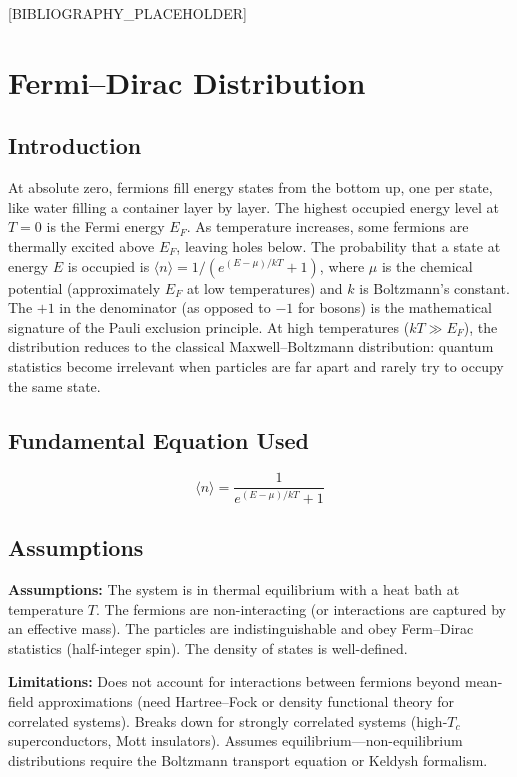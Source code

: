 \documentclass[11pt,openright]{book}
\begin{document}
[BIBLIOGRAPHY_PLACEHOLDER]


\chapter{Fermi--Dirac Distribution}

\section*{Introduction}

At absolute zero, fermions fill energy states from the bottom up, one per state, like water filling a container layer by layer. The highest occupied energy level at $T = 0$ is the Fermi energy $E_F$. As temperature increases, some fermions are thermally excited above $E_F$, leaving holes below. The probability that a state at energy $E$ is occupied is $\langle n \rangle = 1/(e^{(E-\mu)/kT} + 1)$, where $\mu$ is the chemical potential (approximately $E_F$ at low temperatures) and $k$ is Boltzmann's constant. The $+1$ in the denominator (as opposed to $-1$ for bosons) is the mathematical signature of the Pauli exclusion principle. At high temperatures ($kT \gg E_F$), the distribution reduces to the classical Maxwell--Boltzmann distribution: quantum statistics become irrelevant when particles are far apart and rarely try to occupy the same state.
\section*{Fundamental Equation Used}

\[
\langle n \rangle = \frac{1}{e^{(E-\mu)/kT}+1}
\]
\section*{Assumptions}

\textbf{Assumptions:} The system is in thermal equilibrium with a heat bath at temperature $T$. The fermions are non-interacting (or interactions are captured by an effective mass). The particles are indistinguishable and obey Ferm--Dirac statistics (half-integer spin). The density of states is well-defined.


\textbf{Limitations:} Does not account for interactions between fermions beyond mean-field approximations (need Hartree--Fock or density functional theory for correlated systems). Breaks down for strongly correlated systems (high-$T_c$ superconductors, Mott insulators). Assumes equilibrium---non-equilibrium distributions require the Boltzmann transport equation or Keldysh formalism.
\end{document}
